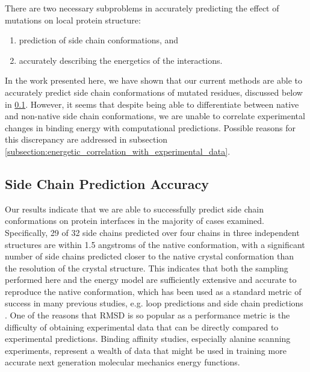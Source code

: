 There are two necessary subproblems in accurately predicting the effect of mutations on local protein structure:
\begin{enumerate}
\item prediction of side chain conformations, and
\item accurately describing the energetics of the interactions.
\end{enumerate}
In the work presented here, we have shown that our current methods are able to accurately predict side chain conformations of mutated residues, discussed below in \ref{subsection:side_chain_prediction_accuracy}.
However, it seems that despite being able to differentiate between native and non-native side chain conformations, we are unable to correlate experimental changes in binding energy with computational predictions.
Possible reasons for this discrepancy are addressed in subsection \ref{subsection:energetic_correlation_with_experimental_data}.

\subsection{Side Chain Prediction Accuracy}
\label{subsection:side_chain_prediction_accuracy}
Our results indicate that we are able to successfully predict side chain conformations on protein interfaces in the majority of cases examined.
Specifically, 29 of 32 side chains predicted over four chains in three independent structures are within 1.5 angstroms of the native conformation, with a significant number of side chains predicted closer to the native crystal conformation than the resolution of the crystal structure.
This indicates that both the sampling performed here and the energy model are sufficiently extensive and accurate to reproduce the native conformation, which has been used as a standard metric of success in many previous studies, e.g. loop predictions \cite{jacobson2004hierarchical,rapp1999prediction,zhu2006long,sellers2008toward} and side chain predictions \cite{jacobson2002force,jacobson2002role,zhu2007improved}.
One of the reasons that RMSD is so popular as a performance metric is the difficulty of obtaining experimental data that can be directly compared to experimental predictions.
Binding affinity studies, especially alanine scanning experiments, represent a wealth of data that might be used in training more accurate next generation molecular mechanics energy functions.


